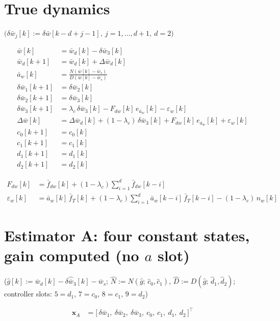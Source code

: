 \documentclass[11pt,a4paper,fontset=none]{ctexart}
\newcommand{\ba}{\bar{a}}
\newcommand{\bw}{\bar{w}}
\newcommand{\dW}{\Delta\bw}
\newcommand{\gh}{\hat g}
\newcommand{\Nh}{\hat N}
\newcommand{\Dh}{\hat D}
\begin{document}
\section{True dynamics}

$\bigl(\delta\bw_j[k] := \delta\bw[k-d+j-1],\ j = 1,\dots,d+1,\ d = 2\bigr)$

\begin{align*}
\bw[k]           &= \bw_d[k] - \delta\bw_3[k] \\
\bw_d[k+1]       &= \bw_d[k] + \Delta\bw_d[k] \\
\ba_w[k]         &= \frac{N(\bw[k] - \bw_s)}{D(\bw[k] - \bw_s)} \\
\delta\bw_1[k+1] &= \delta\bw_2[k] \\
\delta\bw_2[k+1] &= \delta\bw_3[k] \\
\delta\bw_3[k+1] &= \lambda_c\,\delta\bw_3[k] - F_{dw}[k]\,e_{\ba_w}[k] - \varepsilon_w[k] \\
\dW[k]           &= \Delta\bw_d[k] + (1-\lambda_c)\,\delta\bw_3[k] + F_{dw}[k]\,e_{\ba_w}[k] + \varepsilon_w[k] \\
c_0[k+1]         &= c_0[k] \\
c_1[k+1]         &= c_1[k] \\
d_1[k+1]         &= d_1[k] \\
d_2[k+1]         &= d_2[k]
\end{align*}

\begin{align*}
F_{dw}[k]        &= \bar f_{dw}[k] + (1-\lambda_c)\sum_{i=1}^{d}\bar f_{dw}[k-i] \\
\varepsilon_w[k] &= \ba_w[k]\,\bar f_T[k] + (1-\lambda_c)\sum_{i=1}^{d}\ba_w[k-i]\,\bar f_T[k-i] - (1-\lambda_c)\,n_w[k]
\end{align*}

\section{Estimator A: four constant states, gain computed (no $a$ slot)}

($\gh[k] := \bw_d[k] - \delta\hat{\bw}_3[k] - \bw_s$; $\Nh := N(\gh;\,\hat c_0, \hat c_1)$, $\Dh := D(\gh;\,\hat d_1, \hat d_2)$;
controller slots: $5 = d_1$, $7 = c_0$, $8 = c_1$, $9 = d_2$)

\begin{align*}
\mathbf{x}_A &= \bigl[\,\delta\bw_1,\ \delta\bw_2,\ \delta\bw_3,\ c_0,\ c_1,\ d_1,\ d_2\,\bigr]^{\top}
\end{align*}
\end{document}

